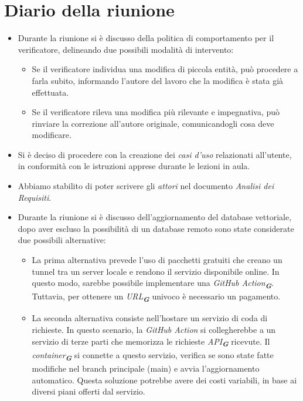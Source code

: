 
\section{Diario della riunione}

\begin{itemize}
    \item Durante la riunione si è discusso della politica di comportamento per il verificatore, delineando due possibili modalità di intervento:
    \begin{itemize}
    \item Se il verificatore individua una modifica di piccola entità, può procedere a farla subito, informando l'autore del lavoro che la modifica è stata già effettuata.
    \item Se il verificatore rileva una modifica più rilevante e impegnativa, può rinviare la correzione all'autore originale, comunicandogli cosa deve modificare.
    \end{itemize}
    \item Si è deciso di procedere con la creazione dei \emph{casi d'uso} relazionati all'utente, in conformità con le istruzioni apprese durante le lezioni in aula.
    \item Abbiamo stabilito di poter scrivere gli \emph{attori} nel documento \emph{Analisi dei Requisiti}.
    \item Durante la riunione si è discusso dell'aggiornamento del database vettoriale, dopo aver escluso la possibilità di un database remoto sono state considerate due possibili alternative:
    \begin{itemize}
        \item La prima alternativa prevede l'uso di pacchetti gratuiti che creano un tunnel tra un server locale e rendono il servizio disponibile online. In questo modo, sarebbe possibile implementare una \emph{GitHub Action}\textsubscript{\textit{\textbf{G}}}. Tuttavia, per ottenere un \emph{URL}\textsubscript{\textit{\textbf{G}}} univoco è necessario un pagamento.
        \item La seconda alternativa consiste nell'hostare un servizio di coda di richieste. In questo scenario, la \emph{GitHub Action} si collegherebbe a un servizio di terze parti che memorizza le richieste \emph{API}\textsubscript{\textit{\textbf{G}}} ricevute. Il \emph{container}\textsubscript{\textit{\textbf{G}}} si connette a questo servizio, verifica se sono state fatte modifiche nel branch principale (main) e avvia l'aggiornamento automatico. Questa soluzione potrebbe avere dei costi variabili, in base ai diversi piani offerti dal servizio.

\end{itemize}
\end{itemize}
